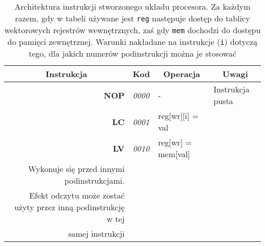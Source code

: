 \begin{landscape}
\begin{longtable}[c]{|r|l|l|l|}
\caption[Architektura instrukcji stworzonego układu procesora]{Architektura instrukcji stworzonego układu procesora. Za każdym razem, gdy w tabeli używane jest \texttt{reg} następuje dostęp do tablicy wektorowych rejestrów wewnętrznych, zaś gdy \texttt{mem} dochodzi do dostępu do pamięci zewnętrznej. Warunki nakładane na instrukcje (\texttt{i}) dotyczą tego, dla jakich numerów podinstrukcji można je stosować}
\label{ch3:tab:instructions}\\
\hline
\multicolumn{1}{|c|}{\textbf{Instrukcja}} & \multicolumn{1}{c|}{\textbf{Kod}} & \multicolumn{1}{c|}{\textbf{Operacja}}                                                                                                      & \multicolumn{1}{c|}{\textbf{Uwagi}}                                                                                                                                                                                                                                                      \\ \hline
\endhead
%
\textbf{NOP}                              & \textit{0000}                     & -                                                                                                                                           & Instrukcja pusta                                                                                                                                                                                                                                                                         \\ \hline
\textbf{LC}                               & \textit{0001}                     & reg{[}wr{]}{[}i{]} = val                                                                                                                    &                                                                                                                                                                                                                                                                                          \\ \hline
\textbf{LV}                               & \textit{0010}                     & reg{[}wr{]} = mem{[}val{]}                                                                                                                  & \begin{tabular}[c]{@{}l@{}}$\mathrm{i\in\left\lbrace 2, 3 \right\rbrace }$\\ Wykonuje się przed innymi podinstrukcjami. \\ Efekt odczytu może zostać użyty przez inną podinstrukcję w tej\\ samej instrukcji\end{tabular}                                                                \\ \hline

\end{longtable}
\end{landscape}
